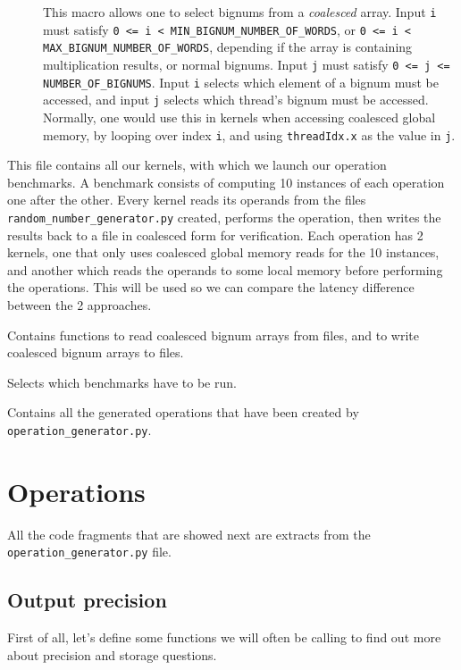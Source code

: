 \documentclass[10pt, a4paper]{report}
\begin{document}
\begin{description}
\begin{description}
\item[] This macro allows one to select bignums from a
\emph{coalesced} array.
Input \verb+i+ must satisfy \verb+0 <= i < MIN_BIGNUM_NUMBER_OF_WORDS+, or
\verb+0 <= i < MAX_BIGNUM_NUMBER_OF_WORDS+, depending if the array is containing
multiplication results, or normal bignums.
Input \verb+j+ must satisfy \verb+0 <= j <= NUMBER_OF_BIGNUMS+.
Input \verb+i+ selects which element of a bignum must be accessed, and input
\verb+j+ selects which thread's bignum must be accessed.
Normally, one would use this in kernels when accessing coalesced global memory,
by looping over index \verb+i+, and using \verb+threadIdx.x+ as the value in
\verb+j+.
\end{description}

\item[\Q{benchmarks.cu}]
This file contains all our kernels, with which we launch our operation
benchmarks.
A benchmark consists of computing 10 instances of each operation one after the
other.
Every kernel reads its operands from the files \verb+random_number_generator.py+
created, performs the operation, then writes the results back to a file in
coalesced form for verification.
Each operation has 2 kernels, one that only uses coalesced global memory reads
for the 10 instances, and another which reads the operands to some local memory
before performing the operations.
This will be used so we can compare the latency difference between the 2
approaches.

\item[\Q{input_output.cpp}]
Contains functions to read coalesced bignum arrays from files, and to write
coalesced bignum arrays to files.

\item[\Q{main.cu}]
Selects which benchmarks have to be run.

\item[\Q{operations.h}]
Contains all the generated operations that have been created by
\verb+operation_generator.py+.
\end{description}

\section{Operations}
All the code fragments that are showed next are extracts from the
\verb+operation_generator.py+ file.

\subsection{Output precision}
First of all, let's define some functions we will often be calling to find out
more about precision and storage questions.
\end{document}
